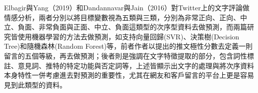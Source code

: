 	 Elbagir與Yang（2019）和Dandannavar與Jain（2016）對Twitter上的文字評論做情感分析，兩者分別以將目標變數視為五類與三類，分別為非常正向、正向、中立、負面、非常負面與正面、中立、負面這類型的次序型資料去做預測，而兩篇研究皆使用機器學習的方法去做預測，如支持向量回歸(SVR)、決策樹(Decision Tree)和隨機森林(Random Forest)等，前者作者以提出的推文極性分數去定義一則留言的五個等級，再去做預測；後者則是強調在文字特徵提取的部分，包含詞性標註、意見詞、推特的特定功能與否定詞等，上述皆顯示出文字的處理與將次序資料本身特性一併考慮進去對預測的重要性，尤其在網友和客戶留言的平台上更是容易見到此類型的資料。




